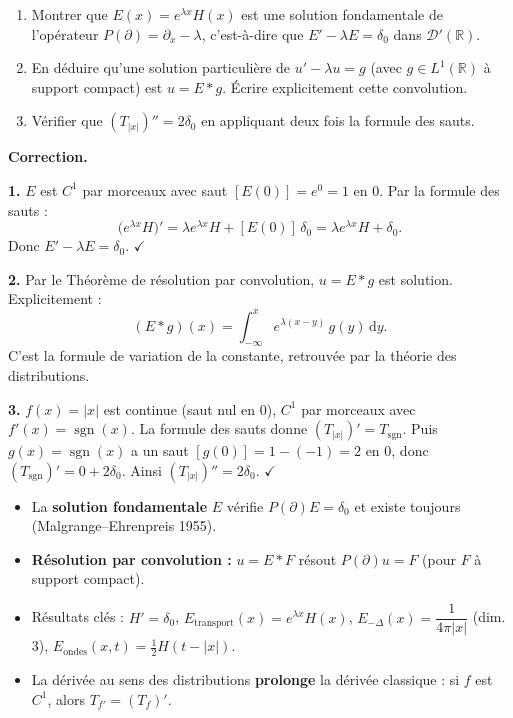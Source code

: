 \documentclass[12pt,a4paper]{article}
\newenvironment{exercice}[1]{%
  \begin{tcolorbox}[enhanced, breakable,
    colback=white, colframe=GrisFonce,
    fonttitle=\bfseries\sffamily, title={Exercice — #1},
    left=6pt, right=6pt, top=4pt, bottom=4pt, arc=3pt]
}{%
  \end{tcolorbox}}
\newenvironment{correction}{%
  \medskip\textbf{Correction.}\enspace\itshape
}{\normalfont\medskip}
\newcommand{\R}{\mathbb{R}}
\newcommand{\sgn}{\operatorname{sgn}}
\begin{document}
\bigskip
\begin{exercice}{Calculer des solutions fondamentales}
\begin{enumerate}[itemsep=5pt]
  \item Montrer que $E(x) = e^{\lambda x}H(x)$ est une solution fondamentale
        de l'opérateur $P(\partial) = \partial_x - \lambda$,
        c'est-à-dire que $E' - \lambda E = \delta_0$ dans $\mathcal{D}'(\R)$.
  \item En déduire qu'une solution particulière de $u' - \lambda u = g$
        (avec $g \in L^1(\R)$ à support compact) est $u = E * g$.
        Écrire explicitement cette convolution.
  \item Vérifier que $(T_{|x|})'' = 2\delta_0$ en appliquant deux fois
        la formule des sauts.
\end{enumerate}
\end{exercice}

\begin{correction}
\textbf{1.} $E$ est $C^1$ par morceaux avec saut $[E(0)] = e^0 = 1$ en $0$.
Par la formule des sauts :
\[
  \bigl(e^{\lambda x}H\bigr)'
  = \lambda e^{\lambda x}H + [E(0)]\,\delta_0
  = \lambda e^{\lambda x}H + \delta_0.
\]
Donc $E' - \lambda E = \delta_0$. $\checkmark$

\medskip
\textbf{2.} Par le Théorème de résolution par convolution, $u = E * g$ est solution.
Explicitement :
\[
  (E * g)(x)
  = \int_{-\infty}^{x} e^{\lambda(x-y)}\,g(y)\,\mathrm{d}y.
\]
C'est la formule de variation de la constante, retrouvée par la théorie des distributions.

\medskip
\textbf{3.} $f(x) = |x|$ est continue (saut nul en $0$), $C^1$ par morceaux avec
$f'(x) = \sgn(x)$. La formule des sauts donne $(T_{|x|})' = T_{\sgn}$.
Puis $g(x) = \sgn(x)$ a un saut $[g(0)] = 1-(-1) = 2$ en $0$, donc
$(T_{\sgn})' = 0 + 2\delta_0$. Ainsi $(T_{|x|})'' = 2\delta_0$. $\checkmark$
\end{correction}

\bigskip
\begin{tcolorbox}[enhanced, colback=GrisClair, colframe=GrisFonce,
  fonttitle=\bfseries\sffamily, title={Ce qu'il faut retenir — Section 7},
  arc=3pt, left=6pt, right=6pt]
\begin{itemize}[itemsep=4pt]
  \item La \textbf{solution fondamentale} $E$ vérifie $P(\partial)E = \delta_0$
        et existe toujours (Malgrange–Ehrenpreis 1955).
  \item \textbf{Résolution par convolution :} $u = E * F$ résout $P(\partial)u = F$
        (pour $F$ à support compact).
  \item Résultats clés :
        $H' = \delta_0$,\quad
        $E_{\text{transport}}(x) = e^{\lambda x}H(x)$,\quad
        $E_{-\Delta}(x) = \dfrac{1}{4\pi|x|}$ (dim.\,3),\quad
        $E_{\text{ondes}}(x,t) = \tfrac{1}{2}H(t-|x|)$.
  \item La dérivée au sens des distributions \textbf{prolonge} la dérivée classique :
        si $f$ est $C^1$, alors $T_{f'} = (T_f)'$.
\end{itemize}
\end{tcolorbox}
\end{document}
